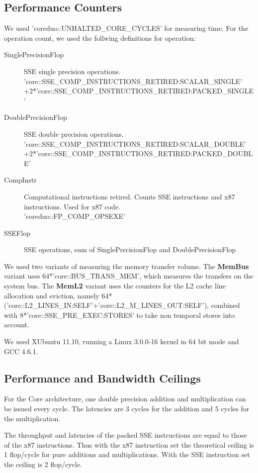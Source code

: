 \documentclass[a4paper,12pt]{article}
\begin{document}
\subsection{Performance Counters}
We used 'coreduo::UNHALTED\_CORE\_CYCLES' for measuring time. For the operation
count, we used the follwing definitions for operation: 
\begin{description}
\item[SinglePrecisionFlop] SSE single precision operations.
\\{\footnotesize
'core::SSE\_COMP\_INSTRUCTIONS\_RETIRED:SCALAR\_SINGLE'\\
+2*'core::SSE\_COMP\_INSTRUCTIONS\_RETIRED:PACKED\_SINGLE'}
\item[DoublePrecisionFlop] SSE double precision operations.
\\{\footnotesize
'core::SSE\_COMP\_INSTRUCTIONS\_RETIRED:SCALAR\_DOUBLE'\\
+2*'core::SSE\_COMP\_INSTRUCTIONS\_RETIRED:PACKED\_DOUBLE'}
\item[CompInstr] Computational instructions retired. Counts SSE instructions
and x87 instructions. Used for x87 code. 
\\{\footnotesize 'coreduo::FP\_COMP\_OPSEXE'}
\item[SSEFlop] SSE operations, sum of SinglePrecisionFlop and
DoublePrecisionFlop
\end{description}

We used two variants of measuring the memory transfer volume. The {\bf MemBus}
variant uses 64*'core::BUS\_TRANS\_MEM', which measures the transfers on the
system bus. The {\bf MemL2} variant uses the counters for the L2 cache line
allocation and eviction, namely
64*('core::L2\_LINES\_IN:SELF'+'core::L2\_M\_LINES\_OUT:SELF'), combined
with 8*'core::SSE\_PRE\_EXEC:STORES' to take non temporal stores
into account.

We used XUbuntu 11.10, running a Linux 3.0.0-16 kernel in 64 bit mode and GCC
4.6.1.

\subsection{Performance and Bandwidth Ceilings}
For the Core architecture, one double precision addition and multiplication can
be issued every cycle. The latencies are 3 cycles for
the addition and 5 cycles for the multiplication. \cite{inteloptimize} 

The throughput and latencies of the packed SSE instructions are equal to those
of the x87 instructions. Thus with the x87 instruction set the theoretical
ceiling is 1 flop/cycle for pure additions and multiplications. With the SSE
instruction set the ceiling is 2 flop/cycle.
\end{document}
